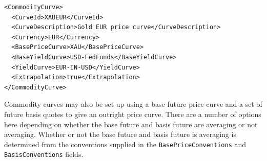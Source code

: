 \begin{longlisting}
\begin{verbatim}
<CommodityCurve>
  <CurveId>XAUEUR</CurveId>
  <CurveDescription>Gold EUR price curve</CurveDescription>
  <Currency>EUR</Currency>
  <BasePriceCurve>XAU</BasePriceCurve>
  <BaseYieldCurve>USD-FedFunds</BaseYieldCurve>
  <YieldCurve>EUR-IN-USD</YieldCurve>
  <Extrapolation>true</Extrapolation>
</CommodityCurve>
\end{verbatim}
\caption{Commodity Curve Configuration for Gold in EUR}
\label{lst:commodity_curve_configuration_3}
\end{longlisting}

Commodity curves may also be set up using a base future price curve and a set of future basis quotes to give an outright price curve. There are a number of options here depending on whether the base future and basis future are averaging or not averaging. Whether or not the base future and basis future is averaging is determined from the conventions supplied in the \lstinline!BasePriceConventions! and \lstinline!BasisConventions! fields.
